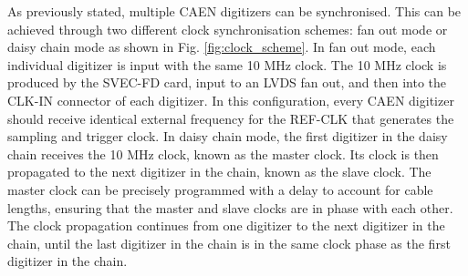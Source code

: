 As previously stated, multiple CAEN digitizers can be synchronised. 
This can be achieved through two different clock synchronisation schemes: fan out mode or daisy chain mode as shown in Fig. \ref{fig:clock_scheme}.
In fan out mode, each individual digitizer is input with the same 10 MHz clock.
The 10 MHz clock is produced by the SVEC-FD card, input to an LVDS fan out, and then into the CLK-IN connector of each digitizer.
In this configuration, every CAEN digitizer should receive identical external frequency for the REF-CLK that generates the sampling and trigger clock.
In daisy chain mode, the first digitizer in the daisy chain receives the 10 MHz clock, known as the master clock.
Its clock is then propagated to the next digitizer in the chain, known as the slave clock.
The master clock can be precisely programmed with a delay to account for cable lengths, ensuring that the master and slave clocks are in phase with each other.
The clock propagation continues from one digitizer to the next digitizer in the chain, until the last digitizer in the chain is in the same clock phase as the first digitizer in the chain.  

